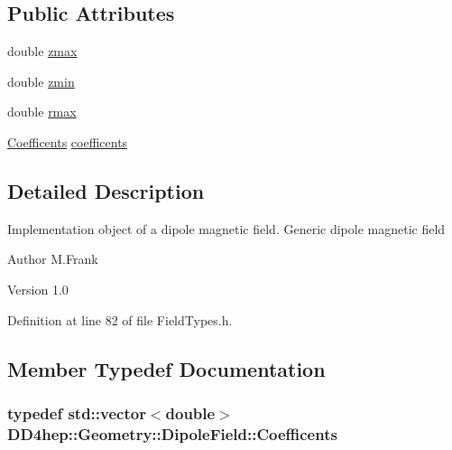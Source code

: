 \subsection*{Public Attributes}
\begin{DoxyCompactItemize}
\item 
double \hyperlink{class_d_d4hep_1_1_geometry_1_1_dipole_field_acc7b4e9b6fac44800ef4f37f65adaefd}{zmax}
\item 
double \hyperlink{class_d_d4hep_1_1_geometry_1_1_dipole_field_a871a5339aaac0458cf912b44317d5eed}{zmin}
\item 
double \hyperlink{class_d_d4hep_1_1_geometry_1_1_dipole_field_a554269ad195ae2b4741fb0df32729168}{rmax}
\item 
\hyperlink{class_d_d4hep_1_1_geometry_1_1_dipole_field_a0e17be76b199f0f144624e6a5eb1f030}{Coefficents} \hyperlink{class_d_d4hep_1_1_geometry_1_1_dipole_field_ae24ace99bfcc72927cd83cf1aede76a9}{coefficents}
\end{DoxyCompactItemize}


\subsection{Detailed Description}
Implementation object of a dipole magnetic field. Generic dipole magnetic field

\begin{DoxyAuthor}{Author}
M.Frank 
\end{DoxyAuthor}
\begin{DoxyVersion}{Version}
1.0 
\end{DoxyVersion}


Definition at line 82 of file FieldTypes.h.

\subsection{Member Typedef Documentation}
\hypertarget{class_d_d4hep_1_1_geometry_1_1_dipole_field_a0e17be76b199f0f144624e6a5eb1f030}{
\subsubsection[{Coefficents}]{\setlength{\rightskip}{0pt plus 5cm}typedef std::vector$<$double$>$ {\bf DD4hep::Geometry::DipoleField::Coefficents}}}
\label{class_d_d4hep_1_1_geometry_1_1_dipole_field_a0e17be76b199f0f144624e6a5eb1f030}


